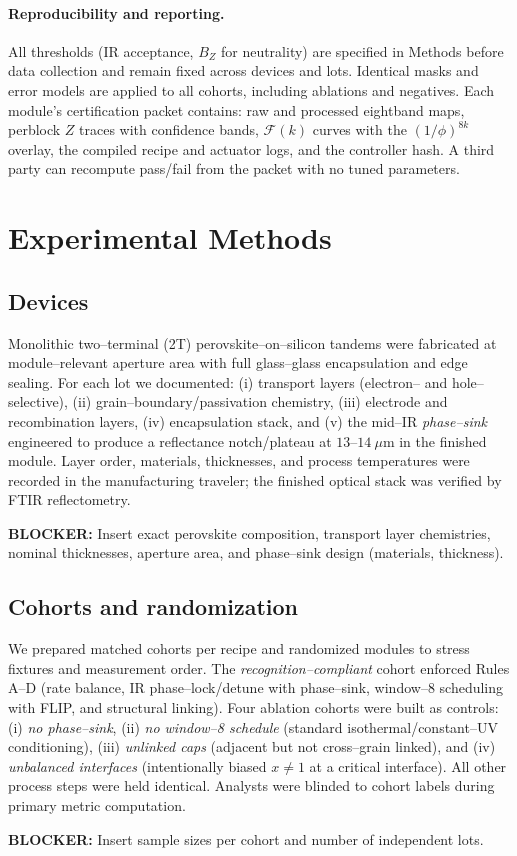 \documentclass[12pt]{article}
\begin{document}
\paragraph{Reproducibility and reporting.}
All thresholds (IR acceptance, $B_Z$ for neutrality) are specified in Methods before data collection and remain fixed across devices and lots. Identical masks and error models are applied to all cohorts, including ablations and negatives. Each module’s certification packet contains: raw and processed eight\textendash band maps, per\textendash block $Z$ traces with confidence bands, $\mathcal{F}(k)$ curves with the $(1/\phi)^{8k}$ overlay, the compiled recipe and actuator logs, and the controller hash. A third party can recompute pass/fail from the packet with no tuned parameters.

\section{Experimental Methods}

\subsection*{Devices}
Monolithic two–terminal (2T) perovskite–on–silicon tandems were fabricated at module–relevant aperture area with full glass–glass encapsulation and edge sealing. For each lot we documented: (i) transport layers (electron– and hole–selective), (ii) grain–boundary/passivation chemistry, (iii) electrode and recombination layers, (iv) encapsulation stack, and (v) the mid–IR \emph{phase–sink} engineered to produce a reflectance notch/plateau at $13$–$14~\mu\mathrm{m}$ in the finished module. Layer order, materials, thicknesses, and process temperatures were recorded in the manufacturing traveler; the finished optical stack was verified by FTIR reflectometry. 
\par\noindent\textbf{BLOCKER:} Insert exact perovskite composition, transport layer chemistries, nominal thicknesses, aperture area, and phase–sink design (materials, thickness).

\subsection*{Cohorts and randomization}
We prepared matched cohorts per recipe and randomized modules to stress fixtures and measurement order. The \emph{recognition–compliant} cohort enforced Rules A–D (rate balance, IR phase–lock/detune with phase–sink, window–8 scheduling with FLIP, and structural linking). Four ablation cohorts were built as controls: (i) \emph{no phase–sink}, (ii) \emph{no window–8 schedule} (standard isothermal/constant–UV conditioning), (iii) \emph{unlinked caps} (adjacent but not cross–grain linked), and (iv) \emph{unbalanced interfaces} (intentionally biased $x\neq 1$ at a critical interface). All other process steps were held identical. Analysts were blinded to cohort labels during primary metric computation.
\par\noindent\textbf{BLOCKER:} Insert sample sizes per cohort and number of independent lots.
\end{document}
